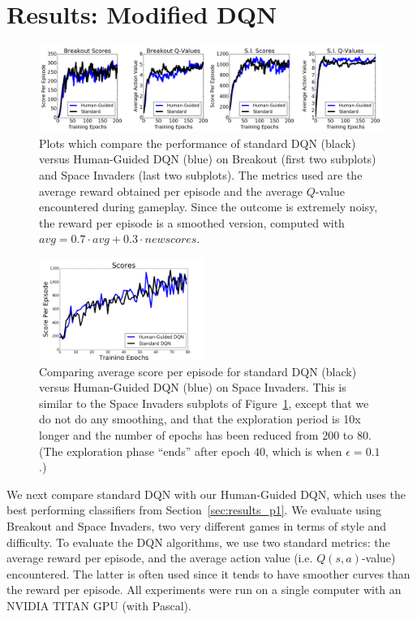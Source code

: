 \documentclass[letterpaper, 10pt, conference]{ieeeconf}
\begin{document}
\section{Results: Modified DQN}\label{sec:results_p2}

\begin{figure}[t]
\centering
\includegraphics[width=1.00\textwidth]{figures/fig_breakout_si_together.png}
\caption{\footnotesize
Plots which compare the performance of standard DQN (black) versus Human-Guided
DQN (blue) on Breakout (first two subplots) and Space Invaders (last two
subplots). The metrics used are the average reward obtained per episode
and the average $Q$-value encountered during gameplay. Since the outcome is
extremely noisy, the reward per episode is a smoothed version, computed with
$avg = 0.7\cdot avg + 0.3\cdot newscores$.
}
\label{fig:human_dqn_performance}
\end{figure}

\begin{figure}[t]
\centering
\includegraphics[width=0.48\textwidth]{figures/fig_space_invaders_longer_exploration.png}
\caption{\footnotesize
Comparing average score per episode for standard DQN (black) versus Human-Guided
DQN (blue) on Space Invaders. This is similar to the Space Invaders subplots of
Figure~\ref{fig:human_dqn_performance}, except that we do not do any smoothing,
and that the exploration period is 10x longer and the number of epochs has been
reduced from 200 to 80.  (The exploration phase ``ends'' after epoch 40, which
is when $\epsilon=0.1$.)
}
\label{fig:sp_inv_longer_exploration}
\end{figure}

We next compare standard DQN with our Human-Guided DQN, which uses the best
performing classifiers from Section~\ref{sec:results_p1}. We evaluate using
Breakout and Space Invaders, two very different games in terms of style and
difficulty.  To evaluate the DQN algorithms, we use two standard metrics: the
average reward per episode, and the average action value (i.e. $Q(s,a)$-value)
encountered. The latter is often used since it tends to have smoother curves
than the reward per episode.  All experiments were run on a single computer with
an NVIDIA TITAN GPU (with Pascal).
\end{document}
